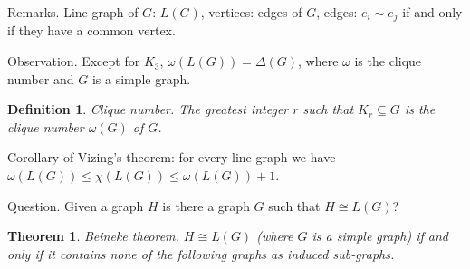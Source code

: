 \documentclass[12pt,a4paper]{article}
\newtheorem{theorem}{Theorem}
\newtheorem{definition}{Definition}
\begin{document}
Remarks.  Line graph of \(G\): \(L(G)\), vertices: edges of \(G\), edges:
\(e_i \sim e_j\) if and only if they have a common vertex.

Observation.  Except for \(K_3\), \(\omega(L(G)) = \Delta(G)\), where \(\omega\)
is the clique number and \(G\) is a simple graph.

\begin{definition}
  Clique number.  The greatest integer \(r\) such that \(K_r \subseteq G\) is
  the clique number \(\omega(G)\) of \(G\).
\end{definition}

Corollary of Vizing's theorem: for every line graph we have
\(\omega(L(G)) \leq \chi(L(G)) \leq \omega(L(G)) + 1\).

Question. Given a graph \(H\) is there a graph \(G\) such that \(H \cong L(G)\)?

\begin{theorem}
  Beineke theorem.  \(H \cong L(G)\) (where \(G\) is a simple graph) if and only
  if it contains none of the following graphs as induced sub-graphs.
\end{theorem}
\end{document}
